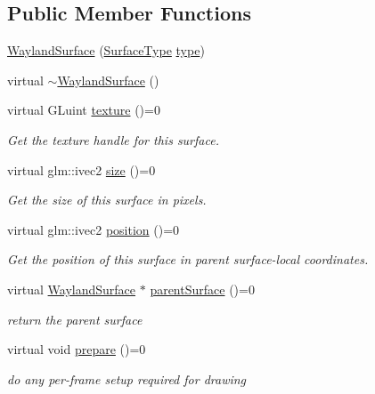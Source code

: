 \subsection*{Public Member Functions}
\begin{DoxyCompactItemize}
\item 
\hyperlink{classmotorcar_1_1WaylandSurface_a3d89131a3967483a4b8e31abae122059}{Wayland\-Surface} (\hyperlink{classmotorcar_1_1WaylandSurface_a7715a41b6776800656722407ec01e0a5}{Surface\-Type} \hyperlink{classmotorcar_1_1WaylandSurface_a0e6e5e2455666f607a8ddb2479ba8e88}{type})
\item 
virtual \hyperlink{classmotorcar_1_1WaylandSurface_a9b6ec8218ecc975308ddb38ddf3dd965}{$\sim$\-Wayland\-Surface} ()
\item 
virtual G\-Luint \hyperlink{classmotorcar_1_1WaylandSurface_aa8ae13d97dae8dfbb610ca6f4ab2b745}{texture} ()=0
\begin{DoxyCompactList}\small\item\em Get the texture handle for this surface. \end{DoxyCompactList}\item 
virtual glm\-::ivec2 \hyperlink{classmotorcar_1_1WaylandSurface_a06182d612aaf0d07780e498066aaca1b}{size} ()=0
\begin{DoxyCompactList}\small\item\em Get the size of this surface in pixels. \end{DoxyCompactList}\item 
virtual glm\-::ivec2 \hyperlink{classmotorcar_1_1WaylandSurface_a22f62be59ac9b8b76a2b2f467f0b1277}{position} ()=0
\begin{DoxyCompactList}\small\item\em Get the position of this surface in parent surface-\/local coordinates. \end{DoxyCompactList}\item 
virtual \hyperlink{classmotorcar_1_1WaylandSurface}{Wayland\-Surface} $\ast$ \hyperlink{classmotorcar_1_1WaylandSurface_a94b48df54c92d9046f786d4d7f5d4ff2}{parent\-Surface} ()=0
\begin{DoxyCompactList}\small\item\em return the parent surface \end{DoxyCompactList}\item 
virtual void \hyperlink{classmotorcar_1_1WaylandSurface_a63669771c03ce580fec8a0099dbd294e}{prepare} ()=0
\begin{DoxyCompactList}\small\item\em do any per-\/frame setup required for drawing \end{DoxyCompactList}\item 

\end{DoxyCompactItemize}
